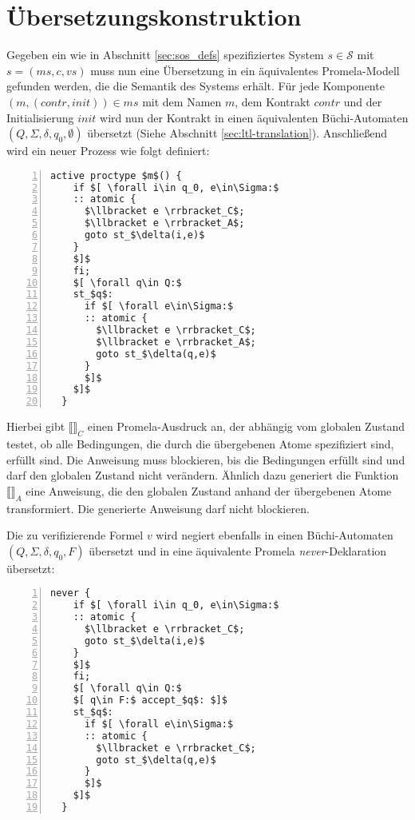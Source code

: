 \section{Übersetzungskonstruktion}
Gegeben ein wie in Abschnitt \ref{sec:sos_defs} spezifiziertes System $s\in \mathcal{S}$ mit $s=(ms,c,vs)$ muss nun eine Übersetzung in ein äquivalentes Promela-Modell gefunden werden, die die Semantik des Systems erhält.
Für jede Komponente $(m,(\mathit{contr},\mathit{init}))\in ms$ mit dem Namen $m$, dem Kontrakt $\mathit{contr}$ und der Initialisierung $\mathit{init}$ wird nun der Kontrakt in einen äquivalenten Büchi-Automaten $(Q,\Sigma,\delta,q_0,\emptyset)$ übersetzt (Siehe Abschnitt \ref{sec:ltl-translation}).
Anschließend wird ein neuer Prozess wie folgt definiert:
\begin{lstlisting}[language=Promela,mathescape=true,numbers=left,numberstyle=\small]
  active proctype $m$() {
    if $[ \forall i\in q_0, e\in\Sigma:$
    :: atomic {
      $\llbracket e \rrbracket_C$;
      $\llbracket e \rrbracket_A$;
      goto st_$\delta(i,e)$
    }
    $]$
    fi;
    $[ \forall q\in Q:$
    st_$q$:
      if $[ \forall e\in\Sigma:$
      :: atomic {
        $\llbracket e \rrbracket_C$;
        $\llbracket e \rrbracket_A$;
        goto st_$\delta(q,e)$
      }
      $]$
    $]$
  }
\end{lstlisting}
Hierbei gibt $\llbracket\rrbracket_C$ einen Promela-Ausdruck an, der abhängig vom globalen Zustand testet, ob alle Bedingungen, die durch die übergebenen Atome spezifiziert sind, erfüllt sind.
Die Anweisung muss blockieren, bis die Bedingungen erfüllt sind und darf den globalen Zustand nicht verändern.
Ähnlich dazu generiert die Funktion $\llbracket\rrbracket_A$ eine Anweisung, die den globalen Zustand anhand der übergebenen Atome transformiert.
Die generierte Anweisung darf nicht blockieren.

Die zu verifizierende Formel $v$ wird negiert ebenfalls in einen Büchi-Automaten $(Q,\Sigma,\delta,q_0,F)$ übersetzt und in eine äquivalente Promela \emph{never}-Deklaration übersetzt:
\begin{lstlisting}[language=Promela,mathescape=true,numbers=left,numberstyle=\small]
  never {
    if $[ \forall i\in q_0, e\in\Sigma:$
    :: atomic {
      $\llbracket e \rrbracket_C$;
      goto st_$\delta(i,e)$
    }
    $]$
    fi;
    $[ \forall q\in Q:$
    $[ q\in F:$ accept_$q$: $]$
    st_$q$:
      if $[ \forall e\in\Sigma:$
      :: atomic {
        $\llbracket e \rrbracket_C$;
        goto st_$\delta(q,e)$
      }
      $]$
    $]$
  }
\end{lstlisting}
